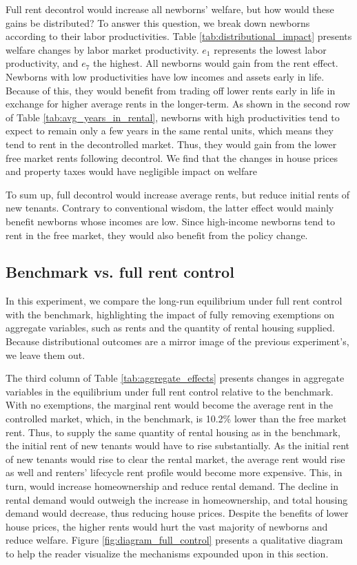 \documentclass[parskip=full]{article}
\begin{document}
Full rent decontrol would increase all newborns' welfare, but how would these gains be distributed? To answer this question, we break down newborns according to their labor productivities. Table \ref{tab:distributional_impact} presents welfare changes by labor market productivity. $e_{1}$ represents the lowest labor productivity, and $e_{7}$ the highest. All newborns would gain from the rent effect. Newborns with low productivities have low incomes and assets early in life. Because of this, they would benefit from trading off lower rents early in life in exchange for higher average rents in the longer-term. As shown in the second row of Table \ref{tab:avg_years_in_rental}, newborns with high productivities tend to expect to remain only a few years in the same rental units, which means they tend to rent in the decontrolled market. Thus, they would gain from the lower free market rents following decontrol. We find that the changes in house prices and property taxes would have negligible impact on welfare 

To sum up, full decontrol would increase average rents, but reduce initial rents of new tenants. Contrary to conventional wisdom, the latter effect would mainly benefit newborns whose incomes are low. Since high-income newborns tend to rent in the free market, they would also benefit from the policy change.

\subsection{Benchmark vs. full rent control}\label{subsection:full_control}

In this experiment, we compare the long-run equilibrium under full rent control with the benchmark, highlighting the impact of fully removing exemptions on aggregate variables, such as rents and the quantity of rental housing supplied. Because distributional outcomes are a mirror image of the previous experiment's, we leave them out.

The third column of Table \ref{tab:aggregate_effects} presents changes in aggregate variables in the equilibrium under full rent control relative to the benchmark. With no exemptions, the marginal rent would become the average rent in the controlled market, which, in the benchmark, is 10.2\% lower than the free market rent. Thus, to supply the same quantity of rental housing as in the benchmark, the initial rent of new tenants would have to rise substantially. As the initial rent of new tenants would rise to clear the rental market, the average rent would rise as well and renters' lifecycle rent profile would become more expensive. This, in turn, would increase homeownership and reduce rental demand. The decline in rental demand would outweigh the increase in homeownership, and total housing demand would decrease, thus reducing house prices. Despite the benefits of lower house prices, the higher rents would hurt the vast majority of newborns and reduce welfare. Figure \ref{fig:diagram_full_control} presents a qualitative diagram to help the reader visualize the mechanisms expounded upon in this section. 
\end{document}
